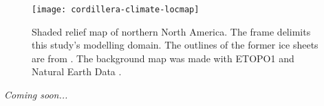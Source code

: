 
\introduction
\label{sec:intro}

\begin{figure}[t]
	\vspace*{2mm}
	\begin{center}
		\texttt{[image: cordillera-climate-locmap]}
	\end{center}
	\caption{Shaded relief map of northern North America. The frame delimits this study's modelling domain. The outlines of the former ice sheets are from \citet{kleman-etal-2010}. The background map was made with ETOPO1 \citep{data:etopo1} and Natural Earth Data \citep{data:naturalearth}.}
	\label{fig:locmap}
\end{figure}

\emph{Coming soon...}


